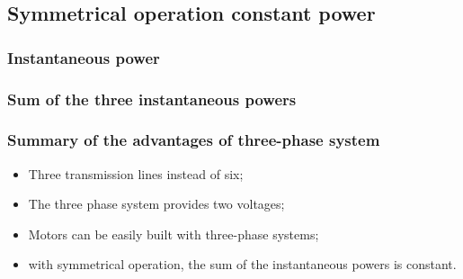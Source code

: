 \documentclass{article}
\begin{document}

\newpage
\subsection{Symmetrical operation \textrightarrow constant power}
\subsubsection{Instantaneous power}

\subsubsection{Sum of the three instantaneous powers}










\newpage
\subsubsection{Summary of the advantages of three-phase system}
\begin{itemize}
    \item Three transmission lines instead of six;
    \item The three phase system provides two voltages;
    \item Motors can be easily built with three-phase systems;
    \item with symmetrical operation, the sum of the instantaneous powers is constant.
\end{itemize}
\end{document}
